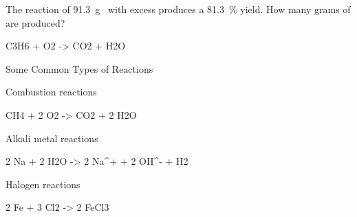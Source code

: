 \documentclass[notes=only]{beamer}
\begin{document}
\begin{onyourown}[20em]
	The reaction of \SI{91.3}{\gram}~ with excess  produces
	a \SI{81.3}{\percent} yield. How many grams of  are produced?
	\begin{reaction*}
		C3H6\gas{} + O2\gas{} -> CO2\gas{} + H2O\lqd{}
	\end{reaction*}
\end{onyourown}

%
%
%
%
%
%
%
%
%
%
%
%
%
%

\begin{frame}{Some Common Types of Reactions}
	\begin{block}{Combustion reactions}
		\begin{reaction*}
			CH4\gas{} + 2 O2\gas{} -> CO2\gas{} + 2
			H2O\gas{}
		\end{reaction*}
	\end{block}

	\begin{block}{Alkali metal reactions}
		\begin{reaction*}
			2 Na\sld{} + 2 H2O\lqd{} -> 2
			Na^{+}\aq{} + 2 OH^{-}\aq{} + H2\gas{}
		\end{reaction*}
	\end{block}

	\begin{block}{Halogen reactions}
		\begin{reaction*}
			2 Fe\sld{} + 3 Cl2\gas{} -> 2
			FeCl3\sld{}
		\end{reaction*}
	\end{block}
\end{frame}
\end{document}
